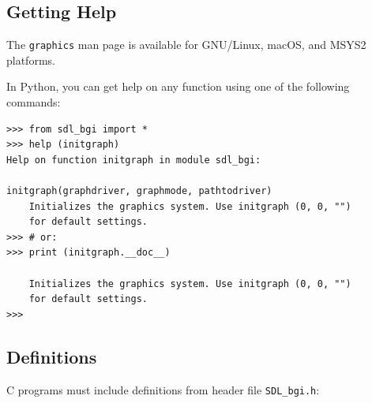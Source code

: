 \documentclass[a4paper,12pt]{article}
\newcommand{\ntt}[1]{\texttt{#1}}
\newcommand{\F}[1]{\ntt{#1}}         %
\begin{document}

\subsection{Getting Help}

The \ntt{graphics} man page is available for GNU/Linux, macOS, and
MSYS2 platforms.

In Python, you can get help on any function using one of the following
commands:

\begin{small}
\begin{spacing}{0.9}
\begin{verbatim}
>>> from sdl_bgi import *
>>> help (initgraph)
Help on function initgraph in module sdl_bgi:

initgraph(graphdriver, graphmode, pathtodriver)
    Initializes the graphics system. Use initgraph (0, 0, "")
    for default settings.
>>> # or:
>>> print (initgraph.__doc__)

    Initializes the graphics system. Use initgraph (0, 0, "")
    for default settings.
>>>
\end{verbatim}
\end{spacing}
\end{small}


\subsection{Definitions}

C programs must include definitions from header file \F{SDL\_bgi.h}:

\lstset{language=C}
\end{document}
